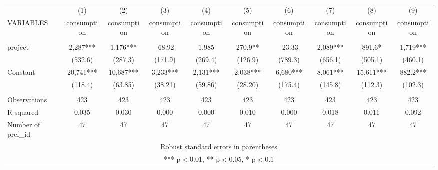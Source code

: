 \documentclass[]{article}
\begin{document}
\begin{tabular}{lccccccccc} \hline
 & (1) & (2) & (3) & (4) & (5) & (6) & (7) & (8) & (9) \\
VARIABLES & consumption & consumption & consumption & consumption & consumption & consumption & consumption & consumption & consumption \\ \hline
 &  &  &  &  &  &  &  &  &  \\
project & 2,287*** & 1,176*** & -68.92 & 1.985 & 270.9** & -23.33 & 2,089*** & 891.6* & 1,719*** \\
 & (532.6) & (287.3) & (171.9) & (269.4) & (126.9) & (789.3) & (656.1) & (505.1) & (460.1) \\
Constant & 20,741*** & 10,687*** & 3,233*** & 2,131*** & 2,038*** & 6,680*** & 8,061*** & 15,611*** & 882.2*** \\
 & (118.4) & (63.85) & (38.21) & (59.86) & (28.20) & (175.4) & (145.8) & (112.3) & (102.3) \\
 &  &  &  &  &  &  &  &  &  \\
Observations & 423 & 423 & 423 & 423 & 423 & 423 & 423 & 423 & 423 \\
R-squared & 0.035 & 0.030 & 0.000 & 0.000 & 0.010 & 0.000 & 0.018 & 0.011 & 0.092 \\
 Number of pref\_id & 47 & 47 & 47 & 47 & 47 & 47 & 47 & 47 & 47 \\ \hline
\multicolumn{10}{c}{ Robust standard errors in parentheses} \\
\multicolumn{10}{c}{ *** p$<$0.01, ** p$<$0.05, * p$<$0.1} \\
\end{tabular}
\end{document}
